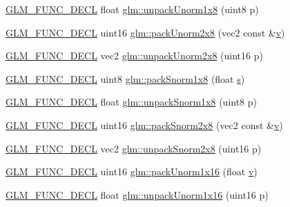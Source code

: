 \begin{DoxyCompactItemize}
\mbox{\hyperlink{setup_8hpp_ab2d052de21a70539923e9bcbf6e83a51}{G\+L\+M\+\_\+\+F\+U\+N\+C\+\_\+\+D\+E\+CL}} float \mbox{\hyperlink{group__gtc__packing_ga32f3f2642df2ea87449d59fb614a8305}{glm\+::unpack\+Unorm1x8}} (uint8 p)
\item 
\mbox{\hyperlink{setup_8hpp_ab2d052de21a70539923e9bcbf6e83a51}{G\+L\+M\+\_\+\+F\+U\+N\+C\+\_\+\+D\+E\+CL}} uint16 \mbox{\hyperlink{group__gtc__packing_ga833288fc0d4a79f19d0db75a6843bfe6}{glm\+::pack\+Unorm2x8}} (vec2 const \&\mbox{\hyperlink{glad_8h_a14cfbe2fc2234f5504618905b69d1e06}{v}})
\item 
\mbox{\hyperlink{setup_8hpp_ab2d052de21a70539923e9bcbf6e83a51}{G\+L\+M\+\_\+\+F\+U\+N\+C\+\_\+\+D\+E\+CL}} vec2 \mbox{\hyperlink{group__gtc__packing_ga96ce0c24339ee676e28a027fffd1edf6}{glm\+::unpack\+Unorm2x8}} (uint16 p)
\item 
\mbox{\hyperlink{setup_8hpp_ab2d052de21a70539923e9bcbf6e83a51}{G\+L\+M\+\_\+\+F\+U\+N\+C\+\_\+\+D\+E\+CL}} uint8 \mbox{\hyperlink{group__gtc__packing_ga26b6cd7a35c46c4b6a342f3b97b47423}{glm\+::pack\+Snorm1x8}} (float \mbox{\hyperlink{glad_8h_af1b1d5edfea6a34daee7389b1b5810ad}{s}})
\item 
\mbox{\hyperlink{setup_8hpp_ab2d052de21a70539923e9bcbf6e83a51}{G\+L\+M\+\_\+\+F\+U\+N\+C\+\_\+\+D\+E\+CL}} float \mbox{\hyperlink{group__gtc__packing_ga6f2bebf536fbf7c8b97d4b306bb3354e}{glm\+::unpack\+Snorm1x8}} (uint8 p)
\item 
\mbox{\hyperlink{setup_8hpp_ab2d052de21a70539923e9bcbf6e83a51}{G\+L\+M\+\_\+\+F\+U\+N\+C\+\_\+\+D\+E\+CL}} uint16 \mbox{\hyperlink{group__gtc__packing_ga05d08a82923166ec7cd5d0e6154c9953}{glm\+::pack\+Snorm2x8}} (vec2 const \&\mbox{\hyperlink{glad_8h_a14cfbe2fc2234f5504618905b69d1e06}{v}})
\item 
\mbox{\hyperlink{setup_8hpp_ab2d052de21a70539923e9bcbf6e83a51}{G\+L\+M\+\_\+\+F\+U\+N\+C\+\_\+\+D\+E\+CL}} vec2 \mbox{\hyperlink{group__gtc__packing_ga27f30f0281b88e152b0895f5e2ead878}{glm\+::unpack\+Snorm2x8}} (uint16 p)
\item 
\mbox{\hyperlink{setup_8hpp_ab2d052de21a70539923e9bcbf6e83a51}{G\+L\+M\+\_\+\+F\+U\+N\+C\+\_\+\+D\+E\+CL}} uint16 \mbox{\hyperlink{group__gtc__packing_ga60c7d915f5653559ae02c2f79a8c5c1d}{glm\+::pack\+Unorm1x16}} (float \mbox{\hyperlink{glad_8h_a14cfbe2fc2234f5504618905b69d1e06}{v}})
\item 
\mbox{\hyperlink{setup_8hpp_ab2d052de21a70539923e9bcbf6e83a51}{G\+L\+M\+\_\+\+F\+U\+N\+C\+\_\+\+D\+E\+CL}} float \mbox{\hyperlink{group__gtc__packing_ga7770e3ade4f4764cc1b2eb42ac4ec188}{glm\+::unpack\+Unorm1x16}} (uint16 p)

\end{DoxyCompactItemize}
